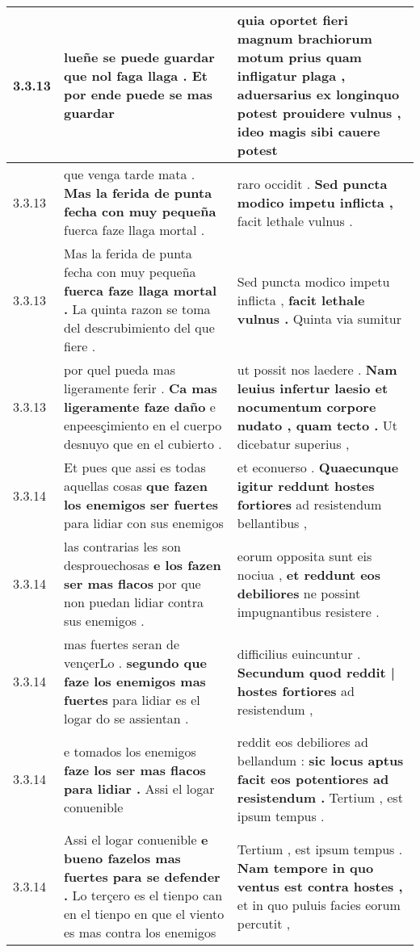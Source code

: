 \begin{tabular}{|p{1cm}|p{6.5cm}|p{6.5cm}|}
3.3.13 & lueñe se puede guardar \textbf{ que nol faga llaga . } Et por ende puede se mas guardar & quia oportet fieri magnum brachiorum motum prius quam infligatur plaga , \textbf{ aduersarius ex longinquo potest prouidere vulnus , } ideo magis sibi cauere potest \\\hline
3.3.13 & que venga tarde mata . \textbf{ Mas la ferida de punta fecha con muy pequeña } fuerca faze llaga mortal . & raro occidit . \textbf{ Sed puncta modico impetu inflicta , } facit lethale vulnus . \\\hline
3.3.13 & Mas la ferida de punta fecha con muy pequeña \textbf{ fuerca faze llaga mortal . } La quinta razon se toma del descrubimiento del que fiere . & Sed puncta modico impetu inflicta , \textbf{ facit lethale vulnus . } Quinta via sumitur \\\hline
3.3.13 & por quel pueda mas ligeramente ferir . \textbf{ Ca mas ligeramente faze daño } e enpeesçimiento en el cuerpo desnuyo que en el cubierto . & ut possit nos laedere . \textbf{ Nam leuius infertur laesio et nocumentum corpore nudato , quam tecto . } Ut dicebatur superius , \\\hline
3.3.14 & Et pues que assi es todas aquellas cosas \textbf{ que fazen los enemigos ser fuertes } para lidiar con sus enemigos & et econuerso . \textbf{ Quaecunque igitur reddunt hostes fortiores } ad resistendum bellantibus , \\\hline
3.3.14 & las contrarias les son desprouechosas \textbf{ e los fazen ser mas flacos } por que non puedan lidiar contra sus enemigos . & eorum opposita sunt eis nociua , \textbf{ et reddunt eos debiliores } ne possint impugnantibus resistere . \\\hline
3.3.14 & mas fuertes seran de vençerLo . \textbf{ segundo que faze los enemigos mas fuertes } para lidiar es el logar do se assientan . & difficilius euincuntur . \textbf{ Secundum quod reddit | hostes fortiores } ad resistendum , \\\hline
3.3.14 & e tomados los enemigos \textbf{ faze los ser mas flacos para lidiar . } Assi el logar conuenible & reddit eos debiliores ad bellandum : \textbf{ sic locus aptus facit eos potentiores ad resistendum . } Tertium , est ipsum tempus . \\\hline
3.3.14 & Assi el logar conuenible \textbf{ e bueno fazelos mas fuertes para se defender . } Lo terçero es el tienpo can en el tienpo en que el viento es mas contra los enemigos & Tertium , est ipsum tempus . \textbf{ Nam tempore in quo ventus est contra hostes , } et in quo puluis facies eorum percutit , \\\hline

\end{tabular}
